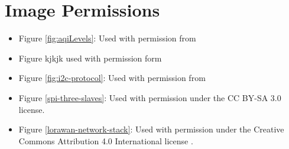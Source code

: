 \section{Image Permissions}


\begin{itemize}
\item Figure \ref{fig:aqiLevels}: Used with permission from

\item Figure kjkjk used with permission form \cite{Thin-Film-Solar-Cell}

\item Figure \ref{fig:i2c-protocol}: Used with permission from \cite{i2c-protocol}

\item Figure \ref{spi-three-slaves}: Used with permission under the CC BY-SA 3.0 license. \cite{spi-image}

\item Figure \ref{lorawan-network-stack}: Used with permission under the Creative Commons Attribution 4.0 International license \cite{lorawan-network-stack}.


\end{itemize}
